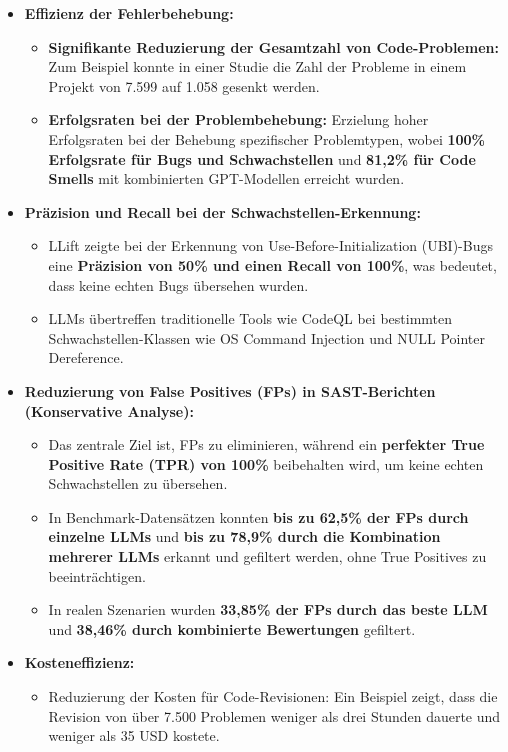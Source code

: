 \begin{itemize}
    \item \textbf{Effizienz der Fehlerbehebung:}
    \begin{itemize}
        \item \textbf{Signifikante Reduzierung der Gesamtzahl von Code-Problemen:} Zum Beispiel konnte in einer Studie die Zahl der Probleme in einem Projekt von 7.599 auf 1.058 gesenkt werden.
        \item \textbf{Erfolgsraten bei der Problembehebung:} Erzielung hoher Erfolgsraten bei der Behebung spezifischer Problemtypen, wobei \textbf{100\% Erfolgsrate für Bugs und Schwachstellen} und \textbf{81,2\% für Code Smells} mit kombinierten GPT-Modellen erreicht wurden.
    \end{itemize}
    \item \textbf{Präzision und Recall bei der Schwachstellen-Erkennung:}
    \begin{itemize}
        \item LLift zeigte bei der Erkennung von Use-Before-Initialization (UBI)-Bugs eine \textbf{Präzision von 50\% und einen Recall von 100\%}, was bedeutet, dass keine echten Bugs übersehen wurden.
        \item LLMs übertreffen traditionelle Tools wie CodeQL bei bestimmten Schwachstellen-Klassen wie OS Command Injection und NULL Pointer Dereference.
    \end{itemize}
    \item \textbf{Reduzierung von False Positives (FPs) in SAST-Berichten (Konservative Analyse):}
    \begin{itemize}
        \item Das zentrale Ziel ist, FPs zu eliminieren, während ein \textbf{perfekter True Positive Rate (TPR) von 100\%} beibehalten wird, um keine echten Schwachstellen zu übersehen.
        \item In Benchmark-Datensätzen konnten \textbf{bis zu 62,5\% der FPs durch einzelne LLMs} und \textbf{bis zu 78,9\% durch die Kombination mehrerer LLMs} erkannt und gefiltert werden, ohne True Positives zu beeinträchtigen.
        \item In realen Szenarien wurden \textbf{33,85\% der FPs durch das beste LLM} und \textbf{38,46\% durch kombinierte Bewertungen} gefiltert.
    \end{itemize}
    \item \textbf{Kosteneffizienz:}
    \begin{itemize}
        \item Reduzierung der Kosten für Code-Revisionen: Ein Beispiel zeigt, dass die Revision von über 7.500 Problemen weniger als drei Stunden dauerte und weniger als 35 USD kostete.
    \end{itemize}
\end{itemize}

